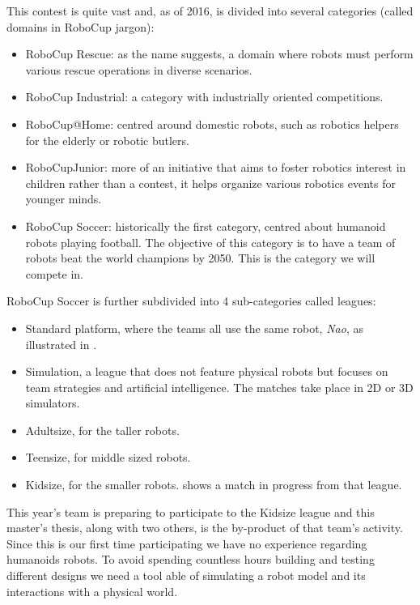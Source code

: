 This contest is quite vast and, as of 2016, is divided into several categories (called domains in RoboCup jargon):
\begin{itemize}
\item RoboCup Rescue: as the name suggests, a domain where robots must perform various rescue operations in diverse scenarios.
\item RoboCup Industrial: a category with industrially oriented competitions.
\item RoboCup@Home: centred around domestic robots, such as robotics helpers for the elderly or robotic butlers.
\item RoboCupJunior: more of an initiative that aims to foster robotics interest in children rather than a contest, it helps organize various robotics events for younger minds.
\item RoboCup Soccer: historically the first category, centred about humanoid robots playing football. The objective of this category is to have a team of robots beat the world champions by 2050. This is the category we will compete in.
\end{itemize}

RoboCup Soccer is further subdivided into 4 sub-categories called leagues:\begin{itemize}
\item Standard platform, where the teams all use the same robot, \emph{Nao}, as illustrated in .
\item Simulation, a league that does not feature physical robots but focuses on team strategies and artificial intelligence. The matches take place in 2D or 3D simulators.
\item Adultsize, for the taller robots.
\item Teensize, for middle sized robots.
\item Kidsize, for the smaller robots.  shows a match in progress from that league.
\end{itemize}

This year's team is preparing to participate to the Kidsize league and this master's thesis, along with two others, is the by-product of that team's activity. Since this is our first time participating we have no experience regarding humanoids robots. To avoid spending countless hours building and testing different designs we need a tool able of simulating a robot model and its interactions with a physical world.  

